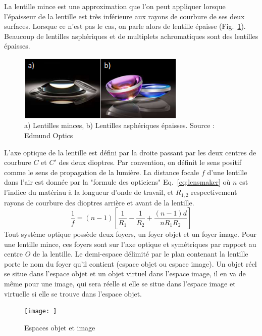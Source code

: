 \documentclass[a4paper]{book}
\begin{document}
La lentille mince est une approximation que l'on peut appliquer lorsque l'épaisseur de la lentille est très inférieure aux rayons de courbure de ses deux surfaces. Lorsque ce n'est pas le cas, on parle alors de lentille épaisse (Fig.~\ref{fig:lentille_mince}). Beaucoup de lentilles asphériques et de multiplets achromatiques sont des lentilles épaisses.
\begin{figure}[!htbp]
\begin{center}
\includegraphics[width=8cm]{lenses.PNG}
\end{center}
\caption{a) Lentilles minces, b) Lentilles asphériques épaisses. Source : Edmund Optics }
\label{fig:lentille_mince}
\end{figure}

L'axe optique de la lentille est défini par la droite passant par les deux centres de courbure $C$ et $C'$ des deux dioptres. Par convention, on définit le sens positif comme le sens de propagation de la lumière.  La distance focale $f$ d'une lentille dans l'air est donnée par la "formule des opticiens" Eq.~\ref{eq:lensmaker} où $n$ est l'indice du matériau à la longueur d'onde de travail, et $R_{1, 2}$ respectivement rayons de courbure des dioptres arrière et avant de la lentille. 
\begin{equation}
\label{eq:lensmaker}
\frac{1}{f}=(n-1)\left[\frac{1}{R_1}-\frac{1}{R_2}+\frac{(n-1)d}{n R_1 R_2}\right]
\end{equation}
Tout système optique possède deux foyers, un foyer objet et un foyer image. Pour une lentille mince, ces foyers sont sur l'axe optique et symétriques par rapport au centre $O$ de la lentille. Le demi-espace délimité par le plan contenant la lentille porte le nom du foyer qu'il contient (espace objet ou espace image). Un objet réel se situe dans l'espace objet et un objet virtuel dans l'espace image, il en va de même pour une image, qui sera réelle si elle se situe dans l'espace image et virtuelle si elle se trouve dans l'espace objet.
\begin{figure}[!htbp]
\begin{center}
\texttt{[image: ]}
\end{center}
\caption{Espaces objet et image}
\label{fig:espaces_lentille_mince}
\end{figure}
\end{document}
